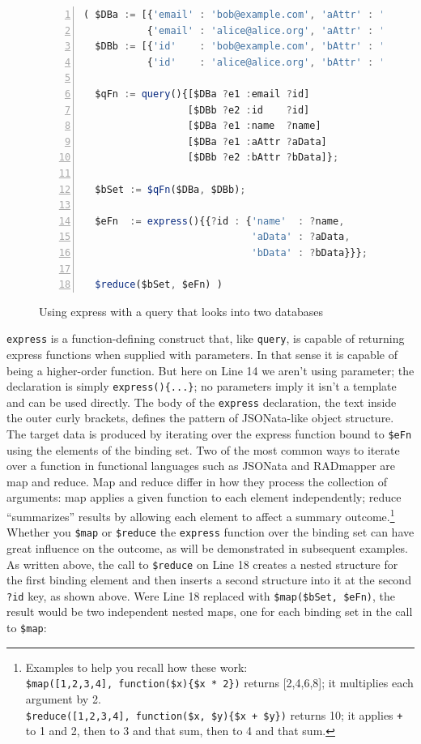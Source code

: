 \documentclass[9pt,letterpaper]{article}
\newcommand{\stt}[1]{\texttt{#1}} %
\begin{document}
\begin{figure}[H]
    \caption{Using express with a query that looks into two databases}
    \label{code:two-database-query-express}
\begin{lstlisting}[language=JavaScript,numberstyle=\scriptsize,basicstyle=\ttfamily\scriptsize,numbers=left,stepnumber=1,breaklines=true]
( $DBa := [{'email' : 'bob@example.com', 'aAttr' : 'Bob-A-data',   'name' : 'Bob'},
           {'email' : 'alice@alice.org', 'aAttr' : 'Alice-A-data', 'name' : 'Alice'}];
  $DBb := [{'id'    : 'bob@example.com', 'bAttr' : 'Bob-B-data'},
           {'id'    : 'alice@alice.org', 'bAttr' : 'Alice-B-data'}];

  $qFn := query(){[$DBa ?e1 :email ?id]
                  [$DBb ?e2 :id    ?id]
                  [$DBa ?e1 :name  ?name]
                  [$DBa ?e1 :aAttr ?aData]
                  [$DBb ?e2 :bAttr ?bData]};

  $bSet := $qFn($DBa, $DBb);

  $eFn  := express(){{?id : {'name'  : ?name,
                             'aData' : ?aData,
                             'bData' : ?bData}}};

  $reduce($bSet, $eFn) )
\end{lstlisting}
\end{figure} \vspace{-2em}

\stt{express} is a function-defining construct that, like \stt{query}, is capable of returning express functions when supplied with parameters.
In that sense it is capable of being a higher-order function.
But here on Line 14 we aren't using parameter; the declaration is simply \stt{express()\{...\}}; no parameters imply it isn't a template and can be used directly.
The body of the \stt{express} declaration, the text inside the outer curly brackets, defines the pattern of JSONata-like object structure.
The target data is produced by iterating over the express function bound to \stt{\$eFn} using the elements of the binding set.
Two of the most common ways to iterate over a function in functional languages such as JSONata and RADmapper are map and reduce.
Map and reduce differ in how they process the collection of arguments:
map applies a given function to each element independently;
reduce ``summarizes'' results by allowing each element to affect a summary outcome.\footnote{Examples to help you recall how these work:
  \\ \stt{\$map([1,2,3,4], function(\$x)\{\$x * 2\})} returns [2,4,6,8]; it multiplies each argument by 2.
  \\ \stt{\$reduce([1,2,3,4], function(\$x, \$y)\{\$x + \$y\})} returns 10; it applies \stt{+} to 1 and 2, then to 3 and that sum,
  then to 4 and that sum.}
Whether you \stt{\$map} or \stt{\$reduce} the \stt{express} function over the binding set can have great influence on the outcome, as will be demonstrated in subsequent examples.
As written above, the call to \stt{\$reduce} on Line 18 creates a nested structure for the first binding element and then inserts a second structure into it at the second \stt{?id} key, as shown above.
Were Line 18 replaced with \stt{\$map(\$bSet, \$eFn)}, the result would be two independent nested maps, one for each binding set in the call to \stt{\$map}:
\end{document}
